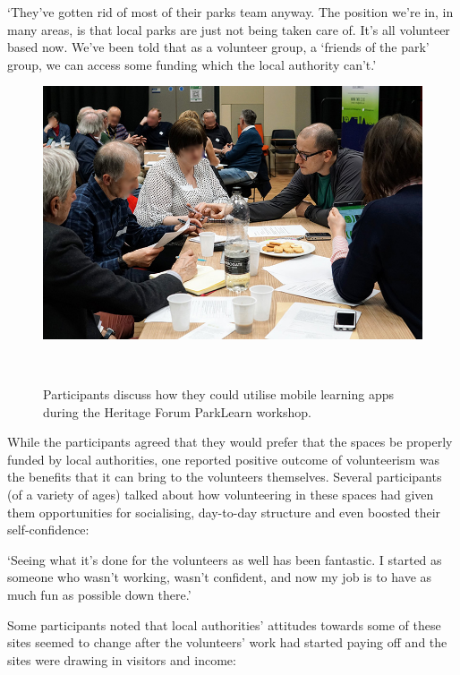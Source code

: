 \begin{displayquote}
`They've gotten rid of most of their parks team anyway. The position we're in, in many areas, is that local parks are just not being taken care of. It's all volunteer based now. We've been told that as a volunteer group, a `friends of the park' group, we can access some funding which the local authority can't.'
\end{displayquote}

\begin{figure}
  \centering
  \includegraphics[width=0.9\columnwidth]{images/chapter06/HF_Workshop.jpg}
  \caption[The Heritage Forum ParkLearn workshop]{Participants discuss how they could utilise mobile learning apps during the Heritage Forum ParkLearn workshop.}~\label{fig:ParkLearnWorkshop}
\end{figure}

While the participants agreed that they would prefer that the spaces be properly funded by local authorities, one reported positive outcome of volunteerism was the benefits that it can bring to the volunteers themselves. Several participants (of a variety of ages) talked about how volunteering in these spaces had given them opportunities for socialising, day-to-day structure and even boosted their self-confidence:

\begin{displayquote}
`Seeing what it's done for the volunteers as well has been fantastic. I started as someone who wasn't working, wasn't confident, and now my job is to have as much fun as possible down there.' 
\end{displayquote}

Some participants noted that local authorities' attitudes towards some of these sites seemed to change after the volunteers' work had started paying off and the sites were drawing in visitors and income:

